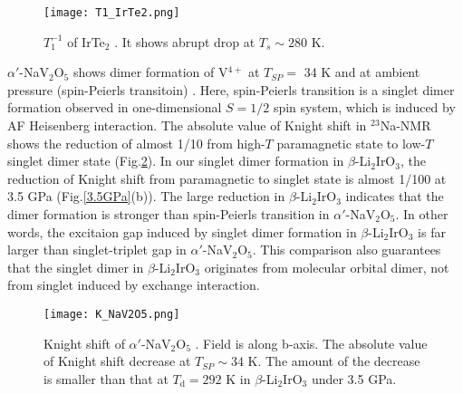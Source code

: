 \begin{figure}
  \centering
  \texttt{[image: T1\_IrTe2.png]}
  \caption{$T^{-1}_1$ of IrTe$_2$ \cite{Mizuno2002}. It shows abrupt drop at $T_s \sim 280$ K.}
  \label{T1_IrTe2}
\end{figure}

$\alpha'$-NaV$_2$O$_5$ shows dimer formation of V$^{4+}$ at $T_{SP} = $ 34 K and at ambient pressure (spin-Peierls transitoin) \cite{Isobe1996}.
Here, spin-Peierls transition is a singlet dimer formation observed in one-dimensional $S = 1/2$ spin system, which is induced by AF Heisenberg interaction.
The absolute value of Knight shift in ${}^{23}$Na-NMR shows the reduction of almost 1/10 from high-$T$ paramagnetic state to low-$T$ singlet dimer state (Fig.\ref{K_NaV2O5}).
In our singlet dimer formation in $\beta$-Li$_2$IrO$_3$, the reduction of Knight shift from paramagnetic to singlet state is almost 1/100 at 3.5 GPa (Fig.\ref{3.5GPa}(b)).
The large reduction in $\beta$-Li$_2$IrO$_3$ indicates that the dimer formation is stronger than spin-Peierls transition in $\alpha'$-NaV$_2$O$_5$.
In other words, the excitaion gap induced by singlet dimer formation in $\beta$-Li$_2$IrO$_3$ is far larger than singlet-triplet gap in $\alpha'$-NaV$_2$O$_5$.
This comparison also guarantees that the singlet dimer in $\beta$-Li$_2$IrO$_3$ originates from molecular orbital dimer, not from singlet induced by exchange interaction.

\begin{figure}
  \centering
  \texttt{[image: K\_NaV2O5.png]}
  \caption{Knight shift of $\alpha'$-NaV$_2$O$_5$ \cite{Ohama1997}.
  Field is along b-axis.
  The absolute value of Knight shift decrease at $T_{SP} \sim 34$ K.
  The amount of the decrease is smaller than that at $T_\mathrm{d} = 292$ K in $\beta$-Li$_2$IrO$_3$ under 3.5 GPa.}
  \label{K_NaV2O5}
\end{figure}

